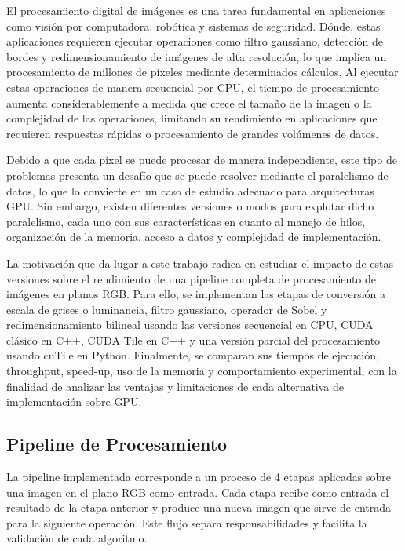\documentclass[12pt,a4paper]{article}
\begin{document}
El procesamiento digital de im\'agenes es una tarea fundamental en aplicaciones como visión por computadora, robótica y sistemas de seguridad. Dónde, estas aplicaciones requieren ejecutar operaciones como filtro gaussiano, detección de bordes y redimensionamiento de imágenes de alta resolución, lo que implica un procesamiento de millones de píxeles mediante determinados cálculos. Al ejecutar estas operaciones de manera secuencial por CPU, el tiempo de procesamiento aumenta considerablemente a medida que crece el tamaño de la imagen o la complejidad de las operaciones, limitando su rendimiento en aplicaciones que requieren respuestas rápidas o procesamiento de grandes volúmenes de datos.

Debido a que cada píxel se puede procesar de manera independiente, este tipo de problemas presenta un desafío que se puede resolver mediante el paralelismo de datos, lo que lo convierte en un caso de estudio adecuado para arquitecturas GPU. Sin embargo, existen diferentes versiones o modos para explotar dicho paralelismo, cada uno con sus características en cuanto al manejo de hilos, organización de la memoria, acceso a datos y complejidad de implementación.

La motivación que da lugar a este trabajo radica en estudiar el impacto de estas versiones sobre el rendimiento de una pipeline completa de procesamiento de imágenes en planos RGB. Para ello, se implementan las etapas de conversión a escala de grises o luminancia, filtro gaussiano, operador de Sobel y redimensionamiento bilineal usando las versiones secuencial en CPU, CUDA clásico en C++, CUDA Tile en C++ y una versión parcial del procesamiento usando cuTile en Python. Finalmente, se comparan sus tiempos de ejecución, throughput, speed-up, uso de la memoria y comportamiento experimental, con la finalidad de analizar las ventajas y limitaciones de cada alternativa de implementación sobre GPU.

\subsection{Pipeline de Procesamiento}


La pipeline implementada corresponde a un proceso de 4 etapas aplicadas sobre una imagen en el plano RGB como entrada. Cada etapa recibe como entrada el resultado de la etapa anterior y produce una nueva imagen que sirve de entrada para la siguiente operación. Este flujo separa responsabilidades y facilita la validación de cada algoritmo.
\end{document}
